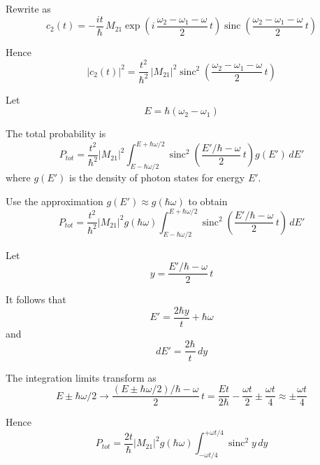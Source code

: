 \documentclass[12pt]{article}
\begin{document}
Rewrite as
\begin{equation*}
c_2(t)=-\frac{it}{\hbar}\,M_{21}
\exp\left(i\,\frac{\omega_2-\omega_1-\omega}{2}\,t\right)
\operatorname{sinc}\left(\frac{\omega_2-\omega_1-\omega}{2}\,t\right)
\tag{2}
\end{equation*}

Hence
\begin{equation*}
|c_2(t)|^2=\frac{t^2}{\hbar^2}\,|M_{21}|^2
\operatorname{sinc}^2\left(\frac{\omega_2-\omega_1-\omega}{2}\,t\right)
\tag{3}
\end{equation*}

Let
\begin{equation*}
E=\hbar(\omega_2-\omega_1)
\end{equation*}

The total probability is
\begin{equation*}
P_{tot}=\frac{t^2}{\hbar^2}|M_{21}|^2
\int_{E-\hbar\omega/2}^{E+\hbar\omega/2}
\operatorname{sinc}^2\left(\frac{E'/\hbar-\omega}{2}\,t\right)
g(E')\,dE'
\end{equation*}
%
where $g(E')$ is the density of photon states for energy $E'$.

\bigskip

Use the approximation $g(E')\approx g(\hbar\omega)$ to obtain
\begin{equation*}
P_{tot}=\frac{t^2}{\hbar^2}|M_{21}|^2g(\hbar\omega)
\int_{E-\hbar\omega/2}^{E+\hbar\omega/2}
\operatorname{sinc}^2\left(\frac{E'/\hbar-\omega}{2}\,t\right)\,dE'
\end{equation*}

Let
\begin{equation*}
y=\frac{E'/\hbar-\omega}{2}\,t
\end{equation*}

It follows that
\begin{equation*}
E'=\frac{2\hbar y}{t}+\hbar\omega
\end{equation*}
%
and
\begin{equation*}
dE'=\frac{2\hbar}{t}\,dy
\end{equation*}

The integration limits transform as
\begin{equation*}
E\pm\hbar\omega/2
\rightarrow
\frac{(E\pm\hbar\omega/2)/\hbar-\omega}{2}\,t
=\frac{Et}{2\hbar}-\frac{\omega t}{2}
\pm\frac{\omega t}{4}
\approx
\pm\frac{\omega t}{4}
\end{equation*}

Hence
\begin{equation*}
P_{tot}=\frac{2t}{\hbar}|M_{21}|^2g(\hbar\omega)
\int_{-\omega t/4}^{+\omega t/4}
\operatorname{sinc}^2y\,dy
\end{equation*}
\end{document}
